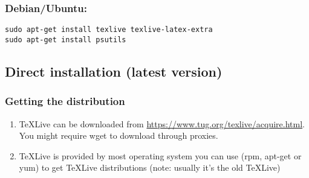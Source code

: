 \documentclass[times,twoside,11pt]{article}
\begin{document}
\subsubsection*{Debian/Ubuntu:}
\begin{lstlisting}[style=shell] 
sudo apt-get install texlive texlive-latex-extra 
sudo apt-get install psutils
\end{lstlisting}

\subsection*{Direct installation (latest version)}
\subsubsection*{Getting the distribution}
\begin{enumerate}
\item	
	\TeX Live can be downloaded from 
	\url{https://www.tug.org/texlive/acquire.html}. You might require 
	wget to download through proxies.

\item
	\TeX Live is provided by most operating system you can use (rpm, 
	apt-get or yum) to get \TeX Live distributions (note: usually it's the old 
	\TeX Live) 
\end{enumerate}
\end{document}

